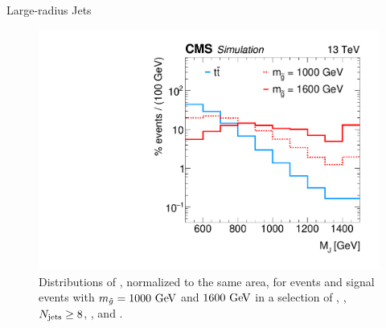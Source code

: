 \begin{section}{Large-radius Jets}
\begin{subsection}{\MJ}
\begin{figure}[tbp!]
\centering
\includegraphics[angle=0,width=0.80\columnwidth]{fig/mj_distributions.pdf}
\caption{Distributions of \MJ, normalized to the same area, for \ttbar events and signal events with $m_{\tilde{g}} = 1000~\mathrm{Ge\kern -0.1em V}$ and $1600~\mathrm{Ge\kern -0.1em V}$ in a selection of \baseNleps, \baseHT, $N_{\mathrm{jets}} \geq 8$, \baseMJ, and \baseNb.}
\label{fig:mj_distributions}
\end{figure}

\end{subsection}

\end{section}
